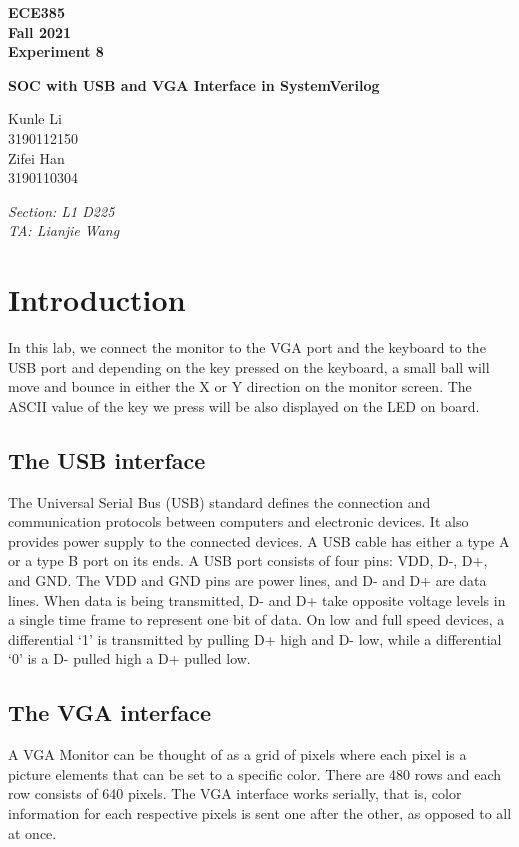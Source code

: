 \documentclass[11pt]{article}
\begin{document}
\begin{titlepage}
    \centering
    {\Huge\bfseries ECE385\\\Large Fall 2021\\\Large Experiment 8}

    \vspace{1cm}
    
    {\LARGE\bfseries SOC with USB and VGA Interface in SystemVerilog}
    
    \vspace{2cm}
    
    {\Large Kunle Li\\3190112150\\Zifei Han\\3190110304}
    
    \vfill
    
    {\large\itshape Section: L1 D225\\TA: Lianjie Wang}
    \end{titlepage}

\tableofcontents
\section{Introduction}
In this lab, we connect the monitor to the VGA port and the keyboard to the USB port and depending on the key pressed on the keyboard, a small ball will move and bounce in either the X or Y direction on the monitor screen. The ASCII value of the key we press will be also displayed on the LED on board.

\subsection{The USB interface}
The Universal Serial Bus (USB) standard defines the connection and communication protocols between computers and electronic devices. It also provides power supply to the connected devices. A USB cable has either a type A or a type B port on its ends. A USB port consists of four pins: VDD, D-, D+, and GND. The VDD and GND pins are 
power lines, and D- and D+ are data lines. When data is being transmitted, D- and D+ take opposite voltage levels in a single time frame to represent one bit of data. On low and full speed devices, a differential ‘1’ is transmitted by pulling D+ high and D- low, while a differential ‘0’ is a D- pulled high a D+ pulled low.

\subsection{The VGA interface}
A VGA Monitor can be thought of as a grid of pixels where each pixel is a picture elements that can be set to a specific color. There are 480 rows and each row consists of 640 pixels. The VGA interface works serially, that is, color information for each respective pixels is sent one after the other, as opposed to all at once.
\end{document}
